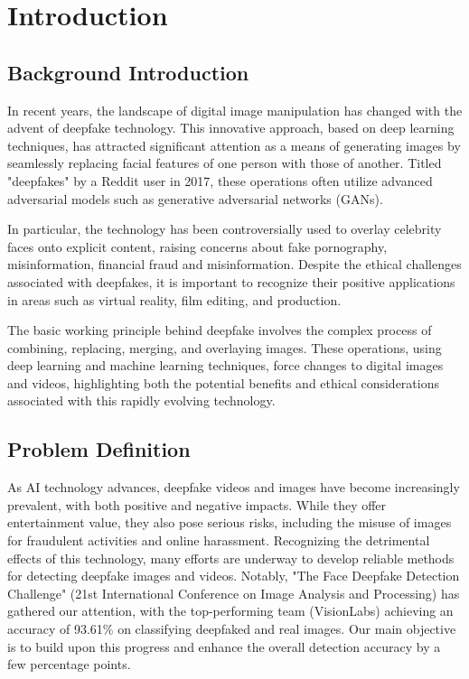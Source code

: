 \chapter{Introduction}
    \section{Background Introduction}
        In recent years, the landscape of digital image manipulation has changed with the advent of deepfake technology.
        This innovative approach, based on deep learning techniques, has attracted significant attention as a means of generating images by seamlessly replacing facial features of one person with those of another.
        Titled "deepfakes" by a Reddit user in 2017, these operations often utilize advanced adversarial models such as generative adversarial networks (GANs). \cite{st2022deep}

        In particular, the technology has been controversially used to overlay celebrity faces onto explicit content, raising concerns about fake pornography, misinformation, financial fraud and misinformation.
        Despite the ethical challenges associated with deepfakes, it is important to recognize their positive applications in areas such as virtual reality, film editing, and production.

        The basic working principle behind deepfake involves the complex process of combining, replacing, merging,  and overlaying images.
        These operations, using deep learning and machine learning techniques, force changes to digital images and videos, highlighting both the potential benefits and ethical considerations associated with this rapidly evolving technology.


    \section{Problem Definition}
        As AI technology advances, deepfake videos and images have become increasingly prevalent, with both positive and negative impacts. While they offer entertainment value, they also pose serious risks, including the misuse of images for fraudulent activities and online harassment. Recognizing the detrimental effects of this technology, many efforts are underway to develop reliable methods for detecting deepfake images and videos. Notably, "The Face Deepfake Detection Challenge" (21st International Conference on Image Analysis and Processing) \cite{jimaging8100263} has gathered our attention, with the top-performing team (VisionLabs) achieving an accuracy of 93.61\% on classifying deepfaked and real images. Our main objective is to build upon this progress and enhance the overall detection accuracy by a few percentage points.

